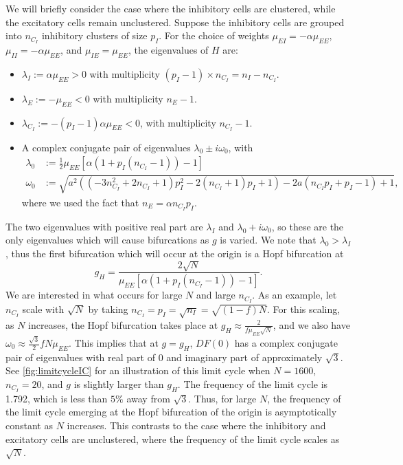 \documentclass[reqno]{siamonline190516}
\begin{document}
We will briefly consider the case where the inhibitory cells are clustered, while the excitatory cells remain unclustered. Suppose the inhibitory cells are grouped into $n_{C_I}$ inhibitory clusters of size $p_I$. For the choice of weights $\mu_{EI} = -\alpha \mu_{EE}$, $\mu_{II} = -\alpha \mu_{EE}$, and $\mu_{IE} = \mu_{EE}$, the eigenvalues of $H$ are:
\begin{itemize}
\item $\lambda_I := \alpha \mu_{EE} > 0$ with multiplicity $(p_I-1) \times n_{C_I} = n_I - n_{C_I}$.
\item $\lambda_E := -\mu_{EE} < 0$ with multiplicity $n_E - 1$.
\item $\lambda_{C_I} := -(p_I-1)\alpha \mu_{EE} < 0$, with multiplicity $n_{C_I}-1$.
\item A complex conjugate pair of eigenvalues $\lambda_0 \pm i \omega_0$, with 
\begin{align*}
    \lambda_0 &:= \frac{1}{2}\mu_{EE} \left[ \alpha( 1 + p_I(n_{C_I}-1)) -1 \right]
      \\
    \omega_0 &:= \sqrt{a^2 \left(\left(-3 n_{C_I}^2+2 n_{C_I}+1\right) p_I^2-2 (n_{C_I}+1) p_I+1\right)-2 a
    (n_{C_I}p_I +p_I -1)+1},
\end{align*}
where we used the fact that $n_E = \alpha n_{C_I} p_I$.
\end{itemize}
The two eigenvalues with positive real part are $\lambda_I$ and $\lambda_0 + i \omega_0$, so these are the only eigenvalues which will cause bifurcations as $g$ is varied. We note that $\lambda_0 > \lambda_I$, thus the first bifurcation which will occur at the origin is a Hopf bifurcation at 
\[
g_H = \frac{2 \sqrt{N}}{\mu_{EE} \left[ \alpha( 1 + p_I(n_{C_I}-1)) -1 \right] }.
\]
We are interested in what occurs for large $N$ and large $n_{C_I}$. As an example, let $n_{C_I}$ scale with $\sqrt{N}$ by taking $n_{C_I} = p_I = \sqrt{n_I} = \sqrt{(1-f)N}$. For this scaling, as $N$ increases, the Hopf bifurcation takes place at $g_H \approx \frac{2}{f \mu_{EE} \sqrt{N}}$, and we also have $\omega_0 \approx \frac{\sqrt{3}}{2}f N \mu_{EE}$. This implies that at $g = g_H$, $DF(0)$ has a complex conjugate pair of eigenvalues with real part of 0 and imaginary part of approximately $\sqrt{3}$. See \cref{fig:limitcycleIC} for an illustration of this limit cycle when $N=1600$, $n_{C_I}=20$, and $g$ is slightly larger than $g_H$. The frequency of the limit cycle is 1.792, which is less than $5\%$ away from $\sqrt{3}$. Thus, for large $N$, the frequency of the limit cycle emerging at the Hopf bifurcation of the origin is asymptotically constant as $N$ increases. This contrasts to the case where the inhibitory and excitatory cells are unclustered, where the frequency of the limit cycle scales as $\sqrt{N}$.
\end{document}
